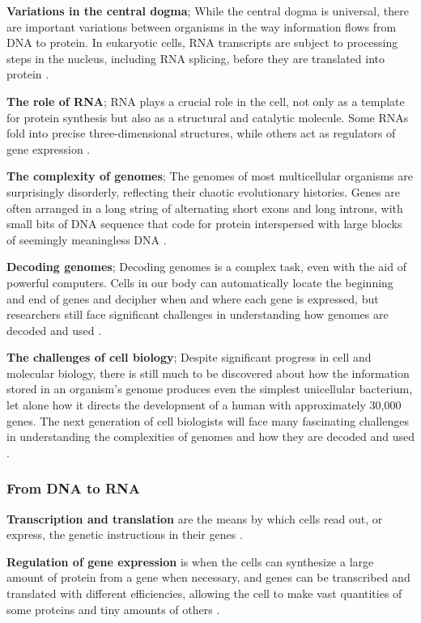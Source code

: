 \textbf{Variations in the central dogma};
While the central dogma is universal, there are important variations between organisms in the way information flows from DNA to protein. In eukaryotic cells, RNA transcripts are subject to processing steps in the nucleus, including RNA splicing, before they are translated into protein \cite*{L1-Chapter6}.

\textbf{The role of RNA};
RNA plays a crucial role in the cell, not only as a template for protein synthesis but also as a structural and catalytic molecule. Some RNAs fold into precise three-dimensional structures, while others act as regulators of gene expression \cite*{L1-Chapter6}.

\textbf{The complexity of genomes};
The genomes of most multicellular organisms are surprisingly disorderly, reflecting their chaotic evolutionary histories. Genes are often arranged in a long string of alternating short exons and long introns, with small bits of DNA sequence that code for protein interspersed with large blocks of seemingly meaningless DNA \cite*{L1-Chapter6}.

\textbf{Decoding genomes};
Decoding genomes is a complex task, even with the aid of powerful computers. Cells in our body can automatically locate the beginning and end of genes and decipher when and where each gene is expressed, but researchers still face significant challenges in understanding how genomes are decoded and used \cite*{L1-Chapter6}.

\textbf{The challenges of cell biology};
Despite significant progress in cell and molecular biology, there is still much to be discovered about how the information stored in an organism's genome produces even the simplest unicellular bacterium, let alone how it directs the development of a human with approximately 30,000 genes. The next generation of cell biologists will face many fascinating challenges in understanding the complexities of genomes and how they are decoded and used \cite*{L1-Chapter6}.

\subsubsection*{From DNA to RNA}
\textbf{Transcription and translation} are the means by which cells read out, or express, the genetic instructions in their genes \cite*{L1-Chapter6}.

\textbf{Regulation of gene expression} is when the cells can synthesize a large amount of protein from a gene when necessary, and genes can be transcribed and translated with different efficiencies, allowing the cell to make vast quantities of some proteins and tiny amounts of others \cite*{L1-Chapter6}.

